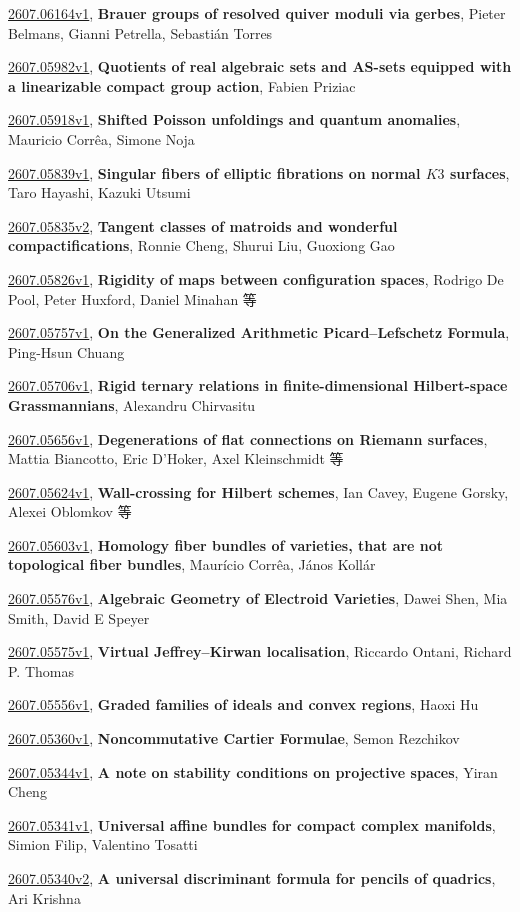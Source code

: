 \documentclass[9pt, a4paper]{article}
\theoremstyle{plain}
\theoremstyle{definition}
\theoremstyle{remark}
\newcommand{\arxiv}[3]{\href{https://arxiv.org/abs/#1}{#1}, \textbf{\textcolor{arxivblue}{#2}}, #3}
\begin{document}
\arxiv{2607.06164v1}{Brauer groups of resolved quiver moduli via gerbes}{Pieter Belmans, Gianni Petrella, Sebastián Torres}

\arxiv{2607.05982v1}{Quotients of real algebraic sets and AS-sets equipped with a linearizable compact group action}{Fabien Priziac}

\arxiv{2607.05918v1}{Shifted Poisson unfoldings and quantum anomalies}{Mauricio Corrêa, Simone Noja}

\arxiv{2607.05839v1}{Singular fibers of elliptic fibrations on normal $K3$ surfaces}{Taro Hayashi, Kazuki Utsumi}

\arxiv{2607.05835v2}{Tangent classes of matroids and wonderful compactifications}{Ronnie Cheng, Shurui Liu, Guoxiong Gao}

\arxiv{2607.05826v1}{Rigidity of maps between configuration spaces}{Rodrigo De Pool, Peter Huxford, Daniel Minahan 等}

\arxiv{2607.05757v1}{On the Generalized Arithmetic Picard--Lefschetz Formula}{Ping-Hsun Chuang}

\arxiv{2607.05706v1}{Rigid ternary relations in finite-dimensional Hilbert-space Grassmannians}{Alexandru Chirvasitu}

\arxiv{2607.05656v1}{Degenerations of flat connections on Riemann surfaces}{Mattia Biancotto, Eric D'Hoker, Axel Kleinschmidt 等}

\arxiv{2607.05624v1}{Wall-crossing for Hilbert schemes}{Ian Cavey, Eugene Gorsky, Alexei Oblomkov 等}

\arxiv{2607.05603v1}{Homology fiber bundles of varieties, that are not topological fiber bundles}{Maurício Corrêa, János Kollár}

\arxiv{2607.05576v1}{Algebraic Geometry of Electroid Varieties}{Dawei Shen, Mia Smith, David E Speyer}

\arxiv{2607.05575v1}{Virtual Jeffrey--Kirwan localisation}{Riccardo Ontani, Richard P. Thomas}

\arxiv{2607.05556v1}{Graded families of ideals and convex regions}{Haoxi Hu}

\arxiv{2607.05360v1}{Noncommutative Cartier Formulae}{Semon Rezchikov}

\arxiv{2607.05344v1}{A note on stability conditions on projective spaces}{Yiran Cheng}

\arxiv{2607.05341v1}{Universal affine bundles for compact complex manifolds}{Simion Filip, Valentino Tosatti}

\arxiv{2607.05340v2}{A universal discriminant formula for pencils of quadrics}{Ari Krishna}
\end{document}
